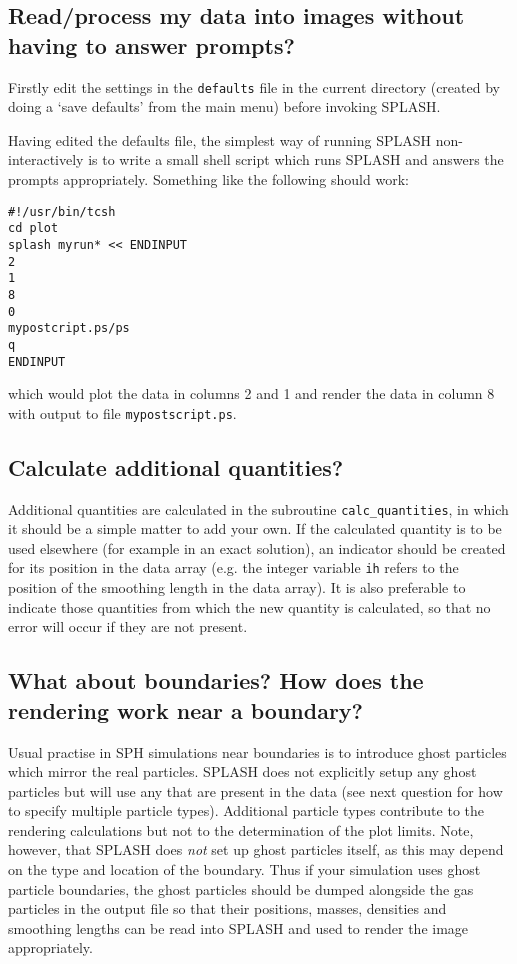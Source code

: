 \documentclass[a4paper,11pt]{article}
\begin{document}
\subsection{Read/process my data into images without having to answer prompts?}
 Firstly edit the settings in the \verb+defaults+ file in the current
directory (created by doing a `save defaults' from the main menu) before invoking SPLASH.

 Having edited the defaults file, the simplest way of running SPLASH
non-interactively is to write a small shell script which runs SPLASH
and answers the prompts appropriately. Something like the following should work:
\begin{verbatim}
#!/usr/bin/tcsh
cd plot
splash myrun* << ENDINPUT
2
1
8
0
mypostcript.ps/ps
q
ENDINPUT
\end{verbatim}
which would plot the data in columns 2 and 1 and render the data in column 8 with
output to file \verb+mypostscript.ps+.

\subsection{Calculate additional quantities?}
 Additional quantities are calculated in the subroutine \verb+calc_quantities+,
in which it should be a simple matter to add your own.
If the calculated quantity is to be used elsewhere (for example in an exact
solution), an indicator should be created for its position in the data array
(e.g. the integer variable \verb+ih+ refers to the position of the smoothing
length in the data array). It is also preferable to indicate those quantities
from which the new quantity is calculated, so that no error will occur if they
are not present.

\subsection{What about boundaries? How does the rendering work near a boundary?}
 Usual practise in SPH simulations near boundaries is
to introduce ghost particles which mirror the real particles. SPLASH does not
explicitly setup any ghost particles but will use any that are present in the data
(see next question for how to specify multiple particle types). Additional particle types contribute
to the rendering calculations but not to the determination of the plot limits. Note,
however, that SPLASH does \emph{not} set up ghost particles itself, as this may depend
on the type and location of the boundary. Thus if your simulation uses ghost particle
boundaries, the ghost particles should be dumped alongside the gas particles in the
output file so that their positions, masses, densities and smoothing lengths can be
read into SPLASH and used to render the image appropriately.
\end{document}
